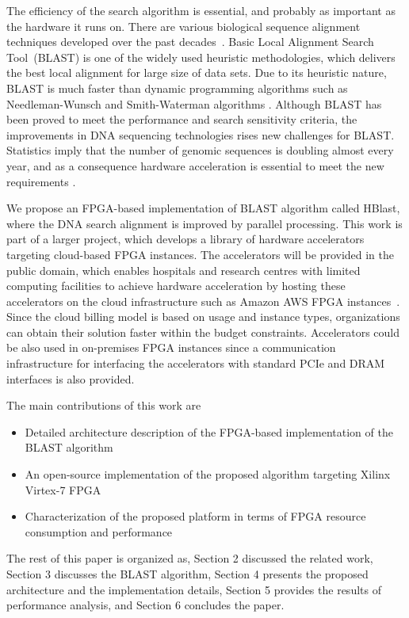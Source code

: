 The efficiency of the search algorithm is essential, and probably as important as the hardware it runs on. 
There are various biological sequence alignment techniques developed over the past decades~\cite{mohd2013}. 
Basic Local Alignment Search Tool~(BLAST) is one of the widely used heuristic methodologies, which delivers the best local alignment for large size of data sets. 
Due to its heuristic nature, BLAST is much faster than dynamic programming algorithms such as Needleman-Wunsch and Smith-Waterman algorithms \cite{wien2011blastp}. 
Although BLAST has been proved to meet the performance and search sensitivity criteria, the improvements in DNA sequencing technologies rises new challenges for BLAST. 
Statistics imply that the number of genomic sequences is doubling almost every year, and as a consequence hardware acceleration is essential to meet the new requirements \cite{wien2011blastp}. 

We propose an FPGA-based implementation of BLAST algorithm called HBlast, where the DNA search alignment is improved by parallel processing. 
This work is part of a larger project, which develops a library of hardware accelerators targeting cloud-based FPGA instances.
The accelerators will be provided in the public domain, which enables hospitals and research centres with limited computing facilities to achieve hardware acceleration by hosting these accelerators on the cloud infrastructure such as Amazon AWS FPGA instances~\cite{aws2018}.
Since the cloud billing model is based on usage and instance types, organizations can obtain their solution faster within the budget constraints.
Accelerators could be also used in on-premises FPGA instances since a communication infrastructure for interfacing the accelerators with standard PCIe and DRAM interfaces is also provided.

The main contributions of this work are
\begin{itemize}
\item Detailed architecture description of the FPGA-based implementation of the BLAST algorithm
\item An open-source implementation of the proposed algorithm targeting Xilinx Virtex-7 FPGA
\item Characterization of the proposed platform in terms of FPGA resource consumption and performance
\end{itemize}

The rest of this paper is organized as, Section 2 discussed the related work, Section 3 discusses the BLAST algorithm, Section 4 presents the proposed architecture and the implementation details, Section 5 provides the results of performance analysis, and Section 6 concludes the paper.